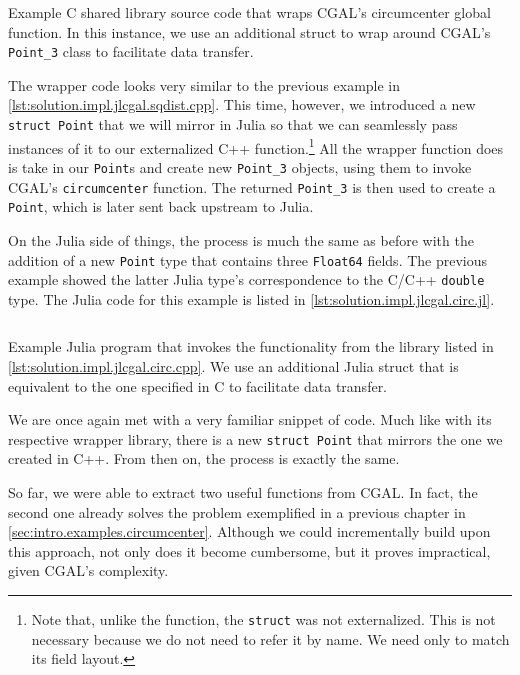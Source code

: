 \begin{listing}[htbp]
  \inputminted{cpp}{cpp/circ.cpp}
  \caption[C wrapper for circumcenter functionality]{
    Example C shared library source code that wraps \ac{CGAL}'s circumcenter
    global function.  In this instance, we use an additional struct to wrap
    around \ac{CGAL}'s \texttt{Point\_3} class to facilitate data transfer.}%
  \label{lst:solution.impl.jlcgal.circ.cpp}
\end{listing}

The wrapper code looks very similar to the previous example in
\cref{lst:solution.impl.jlcgal.sqdist.cpp}.  This time, however, we introduced a
new \texttt{struct Point} that we will mirror in Julia so that we can
seamlessly pass instances of it to our externalized C++ function.\footnote{Note
that, unlike the function, the \texttt{struct} was not externalized.
This is not necessary because we do not need to refer it by name.  We need only
to match its field layout.}  All the wrapper function does is take in our
\texttt{Point}s and create new \texttt{Point\_3} objects, using them to invoke
\ac{CGAL}'s \texttt{circumcenter} function.  The returned \texttt{Point\_3} is
then used to create a \texttt{Point}, which is later sent back upstream to
Julia.

On the Julia side of things, the process is much the same as before with the
addition of a new \texttt{Point} type that contains three
\texttt{Float64} fields. The previous example showed the latter Julia
type's correspondence to the C/C++ \texttt{double} type.  The Julia code
for this example is listed in \cref{lst:solution.impl.jlcgal.circ.jl}.

\begin{listing}[htb]
  \inputminted{julia}{jl/circ.jl}
  \caption[Julia circumcenter example program]{
    Example Julia program that invokes the functionality from the library listed
    in \cref{lst:solution.impl.jlcgal.circ.cpp}.  We use an additional Julia
    struct that is equivalent to the one specified in C to facilitate data
    transfer.}%
  \label{lst:solution.impl.jlcgal.circ.jl}
\end{listing}

We are once again met with a very familiar snippet of code.  Much like with its
respective wrapper library, there is a new \texttt{struct Point} that
mirrors the one we created in C++.  From then on, the process is exactly the
same.

So far, we were able to extract two useful functions from \ac{CGAL}.  In fact,
the second one already solves the problem exemplified in a previous chapter in
\cref{sec:intro.examples.circumcenter}.  Although we could incrementally build
upon this approach, not only does it become cumbersome, but it proves
impractical, given \ac{CGAL}'s complexity.

